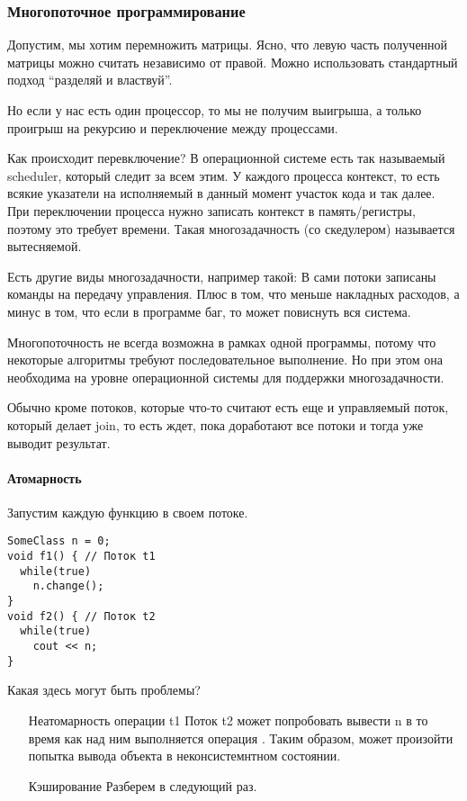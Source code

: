 \subsubsection{Многопоточное программирование}
Допустим, мы хотим перемножить матрицы. Ясно, что левую часть полученной матрицы можно считать независимо от правой. Можно использовать стандартный подход ``разделяй и властвуй''.

Но если у нас есть один процессор, то мы не получим выигрыша, а только проигрыш на рекурсию и переключение между процессами.

Как происходит перевключение? В операционной системе есть так называемый scheduler, который следит за всем этим. У каждого процесса контекст, то есть всякие указатели на исполняемый в данный момент участок кода и так далее. При переключении процесса нужно записать контекст в память/регистры, поэтому это требует времени.
Такая многозадачность (со скедулером) называется вытесняемой.

Есть другие виды многозадачности, например такой:
В сами потоки записаны команды на передачу управления. Плюс в том, что меньше накладных расходов, а минус в том, что если в программе баг, то может повиснуть вся система.

Многопоточность не всегда возможна в рамках одной программы, потому что некоторые алгоритмы требуют последовательное выполнение.
Но при этом она необходима на уровне операционной системы для поддержки многозадачности.

Обычно кроме потоков, которые что-то считают есть еще и управляемый поток, который делает join, то есть ждет, пока доработают все потоки и тогда уже выводит результат.

\paragraph{Атомарность}

Запустим каждую функцию в своем потоке.
\begin{verbatim}
SomeClass n = 0;
void f1() { // Поток t1
  while(true)
    n.change();
}
void f2() { // Поток t2
  while(true)
    cout << n;
}
\end{verbatim}
Какая здесь могут быть проблемы?
\begin{enumerate}
  \item[Неатомарность операции t1] Поток t2 может попробовать вывести n в то время как над ним выполняется операция . Таким образом, может произойти попытка вывода объекта  в неконсистемнтном состоянии.
  \item[Кэширование] Разберем в следующий раз.
\end{enumerate}


